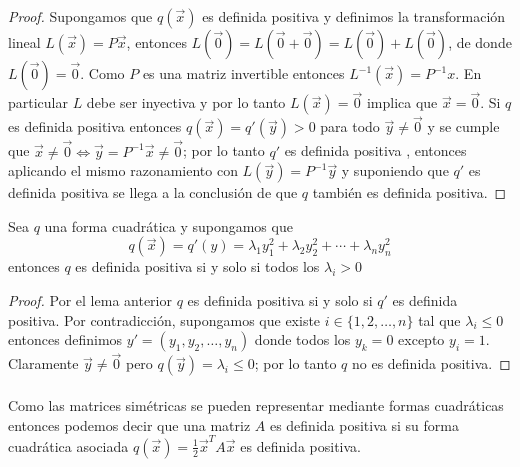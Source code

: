 \begin{proof}
Supongamos que $q(\overrightarrow{x})$ es definida positiva y definimos la transformación lineal $L(\overrightarrow{x}) = P\overrightarrow{x}$, entonces $L(\overrightarrow{0}) = L(\overrightarrow{0}+ \overrightarrow{0}) = L(\overrightarrow{0}) + L(\overrightarrow{0})$, de donde $L(\overrightarrow{0}) = \overrightarrow{0}$. Como $P$ es una matriz invertible entonces $L^{-1}(\overrightarrow{x}) = P^{-1}x$. En particular $L$ debe ser inyectiva y por lo tanto $L(\overrightarrow{x})=\overrightarrow{0}$ implica que $\overrightarrow{x}=\overrightarrow{0}$. Si $q$ es definida positiva entonces $q(\overrightarrow{x}) = q'(\overrightarrow{y}) > 0$ para todo $\overrightarrow{y} \neq \overrightarrow{0}$ y se cumple que $\overrightarrow{x} \neq \overrightarrow{0} \Leftrightarrow \overrightarrow{y} = P^{-1}\overrightarrow{x} \neq \overrightarrow{0}$; por lo tanto $q'$ es definida positiva , entonces aplicando el mismo razonamiento con $L(\overrightarrow{y}) = P^{-1}\overrightarrow{y}$ y suponiendo que $q'$ es definida positiva se llega a la conclusión de que $q$ también es definida positiva. 
\end{proof}
\begin{theorem}
Sea $q$ una forma cuadrática y supongamos que 
\begin{equation*}
q \left(\overrightarrow{x}\right) = q'(y) = \lambda_{1}y_{1}^{2} + \lambda_{2}y_{2}^{2} + \cdots + \lambda_{n}y_{n}^{2}
\end{equation*}
entonces $q$ es definida positiva si y solo si todos los $\lambda_{i} > 0$
\label{teorema:1.4}
\end{theorem}
\begin{proof}
Por el lema anterior $q$ es definida positiva si y solo si $q'$ es definida positiva. Por contradicción, supongamos que existe $i \in \{1, 2, \ldots, n\}$ tal que $\lambda_{i} \leq 0$ entonces definimos $y' = (y_{1}, y_{2}, \ldots, y_{n})$ donde todos los $y_{k}=0$ excepto $y_{i} = 1$. Claramente $\overrightarrow{y} \neq \overrightarrow{0}$ pero $q(\overrightarrow{y}) = \lambda_{i} \leq 0$; por lo tanto $q$ no es definida positiva.
\end{proof}
\paragraph{}
Como las matrices simétricas se pueden representar mediante formas cuadráticas entonces podemos decir que una matriz $A$ es definida positiva si su forma cuadrática asociada $q(\overrightarrow{x}) = \frac{1}{2}\overrightarrow{x}^{T}A\overrightarrow{x}$ es definida positiva.
